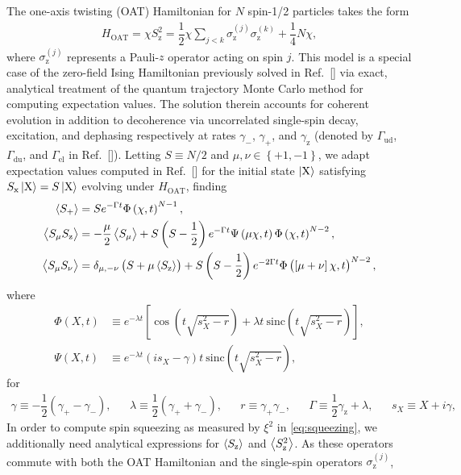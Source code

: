 \documentclass[pra,reprint,longbibliography]{revtex4-1}
\renewcommand{\t}{\text} %
\newcommand{\f}[2]{\dfrac{#1}{#2}} %
\newcommand{\p}[1]{\left(#1\right)} %
\renewcommand{\sp}[1]{\left[#1\right]} %
\renewcommand{\set}[1]{\left\{#1\right\}} %
\newcommand{\bk}{\Braket} %
\newcommand{\z}{\text{z}}
\newcommand{\x}{\text{x}}
\newcommand{\X}{\text{X}}
\newcommand{\1}{\mathds{1}}
\begin{document}
The one-axis twisting (OAT) Hamiltonian for $N$ spin-1/2 particles
takes the form
\begin{align}
  H_{\t{OAT}}
  = \chi S_\z^2
  = \f12 \chi \sum_{j<k} \sigma_\z^{(j)} \sigma_\z^{(k)} + \f14 N \chi,
\end{align}
where $\sigma_\z^{(j)}$ represents a Pauli-$z$ operator acting on spin
$j$.  This model is a special case of the zero-field Ising Hamiltonian
previously solved in Ref.~[] via
exact, analytical treatment of the quantum trajectory Monte Carlo
method for computing expectation values.  The solution therein
accounts for coherent evolution in addition to decoherence via
uncorrelated single-spin decay, excitation, and dephasing respectively
at rates $\gamma_-$, $\gamma_+$, and $\gamma_\z$ (denoted by
$\Gamma_{\t{ud}}$, $\Gamma_{\t{du}}$, and $\Gamma_{\t{el}}$ in
Ref.~[]).  Letting $S\equiv N/2$
and $\mu,\nu\in\set{+1,-1}$, we adapt expectation values computed in
Ref.~[] for the initial state
$\ket{\X}$ satisfying $S_\x\ket{\X}=S\ket{\X}$ evolving under
$H_{\t{OAT}}$, finding
\begin{align}
  \bk{S_+}
  &= S e^{-\Gamma t} \Phi\p{\chi,t}^{N-1}, \label{eq:S+_OAT} \\
  \bk{S_\mu S_\z}
  &= -\f{\mu}{2}\bk{S_\mu} + S \p{S-\f12} e^{-\Gamma t}
  \Psi\p{\mu\chi,t} \Phi\p{\chi,t}^{N-2}, \\
  \bk{S_\mu S_\nu}
  &= \delta_{\mu,-\nu} \p{S + \mu\bk{S_\z}}
  + S \p{S-\f12} e^{-2\Gamma t}
  \Phi\p{\sp{\mu+\nu}\chi,t}^{N-2}, \label{eq:SS+-_OAT}
\end{align}
where
\begin{align}
  \Phi\p{X,t}
  &\equiv e^{-\lambda t} \sp{\cos\p{t\sqrt{s_X^2-r}}
    + \lambda t~\t{sinc}\p{t\sqrt{s_X^2-r}}},
  \\
  \Psi\p{X,t}
  &\equiv e^{-\lambda t} \p{is_X-\gamma}t~
  \t{sinc}\p{t\sqrt{s_X^2-r}},
\end{align}
for
\begin{align}
  \gamma \equiv -\f12 \p{\gamma_+ - \gamma_-},
  &&
  \lambda \equiv \f12 \p{\gamma_+ + \gamma_-},
  &&
  r \equiv \gamma_+ \gamma_-,
  &&
  \Gamma \equiv \f12\gamma_\z + \lambda,
  &&
  s_X \equiv X + i\gamma,
\end{align}
In order to compute spin squeezing as measured by $\xi^2$ in
\eqref{eq:squeezing}, we additionally need analytical expressions for
$\bk{S_\z}$ and $\bk{S_\z^2}$.  As these operators commute with both
the OAT Hamiltonian and the single-spin operators $\sigma_\z^{(j)}$,
\end{document}
